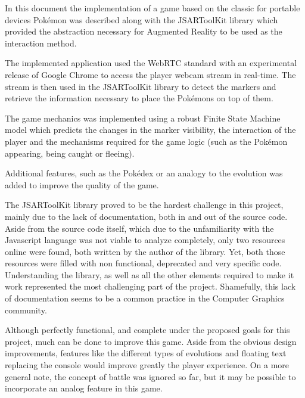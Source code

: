 \label{sec:conclusion}

In this document the implementation of a game based on the classic for portable devices Pokémon\textsuperscript{\textregistered} was described along with the JSARToolKit library which provided the abstraction necessary for Augmented Reality to be used as the interaction method.

The implemented application used the WebRTC standard with an experimental release of Google Chrome to access the player webcam stream in real-time. The stream is then used in the JSARToolKit library to detect the markers and retrieve the information necessary to place the Pokémons on top of them.

The game mechanics was implemented using a robust Finite State Machine model which predicts the changes in the marker visibility, the interaction of the player and the mechanisms required for the game logic (such as the Pokémon appearing, being caught or fleeing).

Additional features, such as the Pokédex or an analogy to the evolution was added to improve the quality of the game.

The JSARToolKit library proved to be the hardest challenge in this project, mainly due to the lack of documentation, both in and out of the source code. Aside from the source code itself, which due to the unfamiliarity with the Javascript language was not viable to analyze completely, only two resources online were found, both written by the author of the library. Yet, both those resources were filled with non functional, deprecated and very specific code. Understanding the library, as well as all the other elements required to make it work represented the most challenging part of the project. Shamefully, this lack of documentation seems to be a common practice in the Computer Graphics community.

Although perfectly functional, and complete under the proposed goals for this project, much can be done to improve this game. Aside from the obvious design improvements, features like the different types of evolutions and floating text replacing the console would improve greatly the player experience. On a more general note, the concept of battle was ignored so far, but it may be possible to incorporate an analog feature in this game.